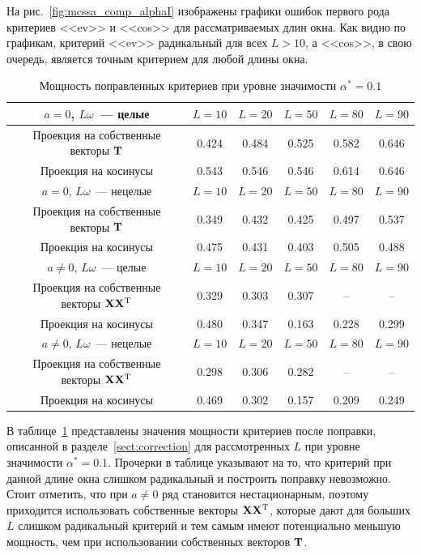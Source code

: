 \documentclass[specialist,
substylefile = spbu_report.rtx,
subf,href,colorlinks=true, 12pt]{disser}
\theoremstyle{definition}
\begin{document}
На рис.~\ref{fig:mcssa_comp_alphaI} изображены графики ошибок первого рода критериев <<ev>> и <<cos>> для рассматриваемых длин окна. Как видно по графикам, критерий <<ev>> радикальный для всех $L>10$, а <<cos>>, в свою очередь, является точным критерием для любой длины окна.

\begin{table}[h!]
	\centering
	\caption{Мощность поправленных критериев при уровне значимости $\alpha^*=0.1$}
	\label{tab:mcssa_comp_power}
	\begin{tabular}{c|c|c|c|c|c}
		$a=0$, $L\omega$~--- целые                      & $L=10$ & $L=20$ & $L=50$ & $L=80$ & $L=90$ \\
		\hline
		Проекция на собственные векторы $\mathbf{T}$          & 0.424  & 0.484  & 0.525  & 0.582  & 0.646  \\
		\hline
		Проекция на косинусы                            & 0.543  & 0.546  & 0.546  & 0.614  & 0.646  \\
		\hhline{======}
		$a=0$, $L\omega$~--- нецелые                    & $L=10$ & $L=20$ & $L=50$ & $L=80$ & $L=90$ \\
		\hline
		Проекция на собственные векторы $\mathbf{T}$          & 0.349  & 0.432  & 0.425  & 0.497  & 0.537  \\
		\hline
		Проекция на косинусы                            & 0.475  & 0.431  & 0.403  & 0.505  & 0.488  \\
		\hhline{======}
		$a\ne0$, $L\omega$~--- целые                    & $L=10$ & $L=20$ & $L=50$ & $L=80$ & $L=90$ \\
		\hline
		Проекция на собственные векторы $\mathbf{X}\mathbf{X}^{\mathrm{T}}$ & 0.329  & 0.303  & 0.307  & --     & --     \\
		\hline
		Проекция на косинусы                            & 0.480  & 0.347  & 0.163  & 0.228  & 0.299  \\
		\hhline{======}
		$a\ne0$, $L\omega$~--- нецелые                  & $L=10$ & $L=20$ & $L=50$ & $L=80$ & $L=90$ \\
		\hline
		Проекция на собственные векторы $\mathbf{X}\mathbf{X}^{\mathrm{T}}$ & 0.298  & 0.306  & 0.282  & --     & --     \\
		\hline
		Проекция на косинусы                            & 0.469  & 0.302  & 0.157  & 0.209  & 0.249  \\
	\end{tabular}
\end{table}

В таблице~\ref{tab:mcssa_comp_power} представлены значения мощности критериев после поправки, описанной в разделе~\ref{sect:correction} для рассмотренных $L$ при уровне значимости $\alpha^*=0.1$. Прочерки в таблице указывают на то, что критерий при данной длине окна слишком радикальный и построить поправку невозможно. Стоит отметить, что при $a\ne0$ ряд становится нестационарным, поэтому приходится использовать собственные векторы $\mathbf{X}\mathbf{X}^{\mathrm{T}}$, которые дают для больших $L$ слишком радикальный критерий и тем самым имеют потенциально меньшую мощность, чем при использовании собственных векторов $\mathbf{T}$.
\end{document}

